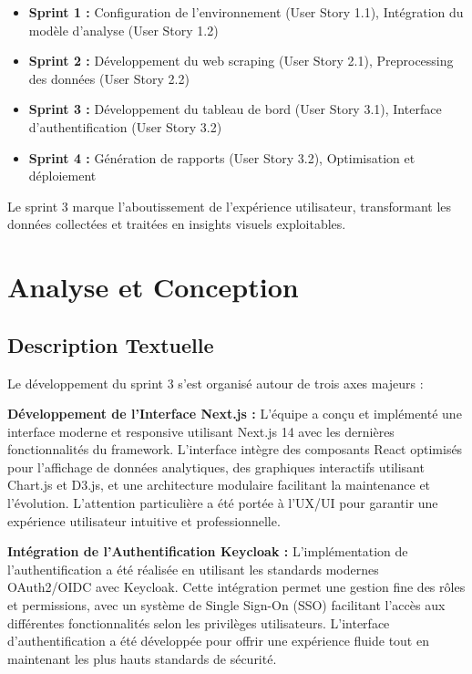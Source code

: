 \begin{itemize}
    \item \textbf{Sprint 1 :} Configuration de l'environnement (User Story 1.1), Intégration du modèle d'analyse (User Story 1.2)
    \item \textbf{Sprint 2 :} Développement du web scraping (User Story 2.1), Preprocessing des données (User Story 2.2)
    \item \textbf{Sprint 3 :} Développement du tableau de bord (User Story 3.1), Interface d'authentification (User Story 3.2)
    \item \textbf{Sprint 4 :} Génération de rapports (User Story 3.2), Optimisation et déploiement
\end{itemize}

Le sprint 3 marque l'aboutissement de l'expérience utilisateur, transformant les données collectées et traitées en insights visuels exploitables.

\section{Analyse et Conception}

\subsection{Description Textuelle}

Le développement du sprint 3 s'est organisé autour de trois axes majeurs :

\textbf{Développement de l'Interface Next.js :} L'équipe a conçu et implémenté une interface moderne et responsive utilisant Next.js 14 avec les dernières fonctionnalités du framework. L'interface intègre des composants React optimisés pour l'affichage de données analytiques, des graphiques interactifs utilisant Chart.js et D3.js, et une architecture modulaire facilitant la maintenance et l'évolution. L'attention particulière a été portée à l'UX/UI pour garantir une expérience utilisateur intuitive et professionnelle.

\textbf{Intégration de l'Authentification Keycloak :} L'implémentation de l'authentification a été réalisée en utilisant les standards modernes OAuth2/OIDC avec Keycloak. Cette intégration permet une gestion fine des rôles et permissions, avec un système de Single Sign-On (SSO) facilitant l'accès aux différentes fonctionnalités selon les privilèges utilisateurs. L'interface d'authentification a été développée pour offrir une expérience fluide tout en maintenant les plus hauts standards de sécurité.

